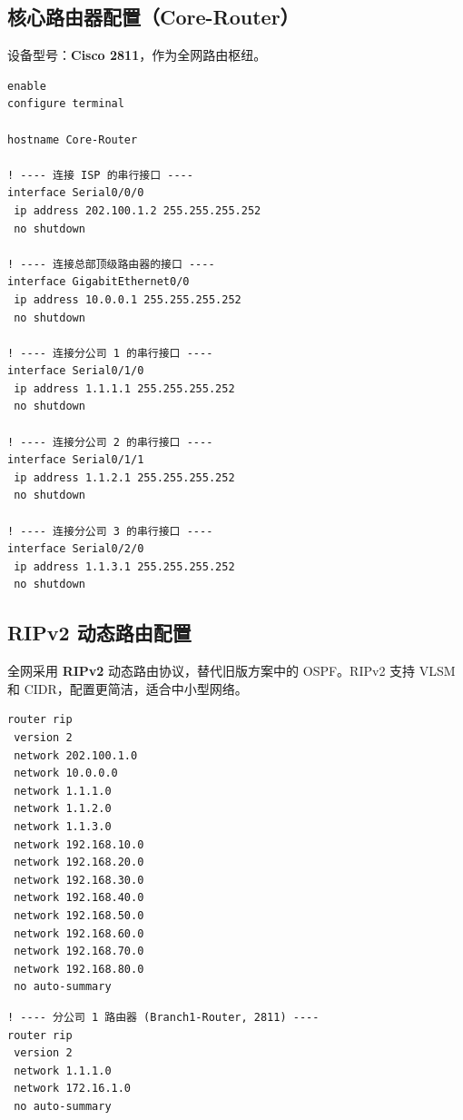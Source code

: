 \documentclass[12pt,a4paper]{ctexart}
\begin{document}
\subsection{核心路由器配置（Core-Router）}

设备型号：\textbf{Cisco 2811}，作为全网路由枢纽。

\begin{lstlisting}[caption={核心路由器基础配置}, label={lst:core-router}]
enable
configure terminal

hostname Core-Router

! ---- 连接 ISP 的串行接口 ----
interface Serial0/0/0
 ip address 202.100.1.2 255.255.255.252
 no shutdown

! ---- 连接总部顶级路由器的接口 ----
interface GigabitEthernet0/0
 ip address 10.0.0.1 255.255.255.252
 no shutdown

! ---- 连接分公司 1 的串行接口 ----
interface Serial0/1/0
 ip address 1.1.1.1 255.255.255.252
 no shutdown

! ---- 连接分公司 2 的串行接口 ----
interface Serial0/1/1
 ip address 1.1.2.1 255.255.255.252
 no shutdown

! ---- 连接分公司 3 的串行接口 ----
interface Serial0/2/0
 ip address 1.1.3.1 255.255.255.252
 no shutdown
\end{lstlisting}

\subsection{RIPv2 动态路由配置}

全网采用 \textbf{RIPv2} 动态路由协议，替代旧版方案中的 OSPF。RIPv2 支持 VLSM 和 CIDR，配置更简洁，适合中小型网络。

\begin{lstlisting}[caption={Core-Router RIPv2 路由配置}, label={lst:rip-core}]
router rip
 version 2
 network 202.100.1.0
 network 10.0.0.0
 network 1.1.1.0
 network 1.1.2.0
 network 1.1.3.0
 network 192.168.10.0
 network 192.168.20.0
 network 192.168.30.0
 network 192.168.40.0
 network 192.168.50.0
 network 192.168.60.0
 network 192.168.70.0
 network 192.168.80.0
 no auto-summary
\end{lstlisting}

\begin{lstlisting}[caption={Branch-Router RIPv2 配置（以分公司1为例）}, label={lst:rip-branch}]
! ---- 分公司 1 路由器 (Branch1-Router, 2811) ----
router rip
 version 2
 network 1.1.1.0
 network 172.16.1.0
 no auto-summary
\end{lstlisting}
\end{document}
